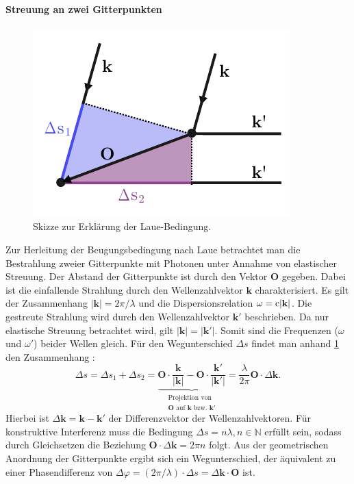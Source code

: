 \paragraph{Streuung an zwei Gitterpunkten}
\begin{figure}
    \centering
    \includegraphics{../assets/theorie/lauebeugung}
    \caption{Skizze zur Erklärung der Laue-Bedingung. } \label{fig:laue}
\end{figure}
Zur Herleitung der Beugungsbedingung nach Laue betrachtet man die Bestrahlung zweier Gitterpunkte mit Photonen unter
Annahme von elastischer Streuung.
Der Abstand der Gitterpunkte ist durch den Vektor $\mathbf{O}$ gegeben.
Dabei ist die einfallende Strahlung durch den Wellenzahlvektor  $\mathbf{k}$ charakterisiert.
Es gilt der Zusammenhang $\lvert \mathbf{k} \rvert = 2 \pi / \lambda$ und die Dispersionsrelation
$\omega = \mathrm{c} \lvert \mathbf{k} \rvert$.
Die gestreute Strahlung wird durch den Wellenzahlvektor $\mathbf{k}'$ beschrieben.
Da nur elastische Streuung betrachtet wird, gilt $\lvert \mathbf{k} \rvert=\lvert \mathbf{k}' \rvert$.
Somit sind die Frequenzen ($\omega$ und $\omega'$) beider Wellen gleich.
Für den Wegunterschied $\Delta s$ findet man anhand \cref{fig:laue} den Zusammenhang \autocite{Ashcroft}:
\begin{equation}
    \Delta s = \Delta s_{1} + \Delta s_{2} = \underbrace{ \mathbf{O} \cdot \frac{\mathbf{k}}{\lvert \mathbf{k} \rvert }
    -\mathbf{O}\cdot \frac{\mathbf{k}'}{\lvert \mathbf{k}' \rvert}  }_{\substack{\text{Projektion von } \\ \mathbf{O} \text{ auf }
    \mathbf{k} \text{ bzw. }\mathbf{k'} }} =  \frac{\lambda}{2\pi} \mathbf{O}\cdot\Delta \mathbf{k}.
    \label{eq:laue}
\end{equation}
Hierbei ist $\Delta \mathbf{k} = \mathbf{k}-\mathbf{k}'$ der Differenzvektor der Wellenzahlvektoren.
Für konstruktive Interferenz muss die Bedingung $\Delta s = n \lambda, n \in \mathbb{N}$ erfüllt sein, sodass durch
Gleichsetzen die Beziehung $\mathbf{O}\cdot\Delta \mathbf{k} =2\pi n$ folgt.
Aus der geometrischen Anordnung der Gitterpunkte ergibt sich ein Wegunterschied, der äquivalent
zu einer Phasendifferenz von $\Delta\varphi=(2\pi / \lambda) \cdot \Delta s = \Delta \mathbf{k}\cdot \mathbf{O}$ ist.

